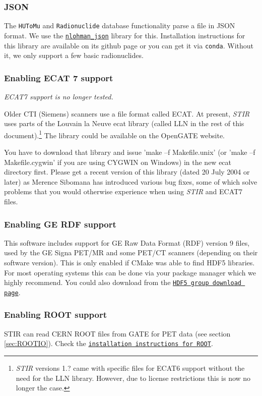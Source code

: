 \documentclass{article}
\def\url#1#2{\mbox{\href{#1}{\tt #2}}}
\begin{document}
\subsubsection{JSON}
The \texttt{HUToMu} and \texttt{Radionuclide} database functionality parse a file in JSON format. We use the
\url{https://github.com/nlohmann/json}{nlohman\_json} library for this. Installation
instructions for this library are available on its github page or you can get it via \texttt{conda}.
Without it, we only support a few basic radionuclides.

\subsubsection{
Enabling ECAT 7 support\label{sec:ECAT67support}}
{\em ECAT7 support is no longer tested.}

Older CTI (Siemens) scanners use a file format called ECAT\texttrademark{}.
At present, \textit{STIR} uses parts of the Louvain la Neuve ecat library (called LLN in
the rest of this document).\footnote{\textit{STIR} versions 1.? came with
specific files for ECAT6 support without the need for the LLN library. 
However, due to license restrictions this is now no longer the case.} 
The library could be  available on  the OpenGATE website.

You have to download that library and issue 'make --f Makefile.unix' 
(or 'make --f Makefile.cygwin' if you are using CYGWIN on Windows) 
in the new ecat directory first. Please get a recent version 
of this library (dated 20 July 2004 or later) as Merence Sibomana 
has introduced various bug fixes, some of which solve problems 
that you would otherwise experience when using \textit{STIR} and ECAT7 
files.

\subsubsection{
Enabling GE RDF  support}
\label{sec:RDFsupport}
This software includes support for GE Raw Data Format (RDF) version 9 files, used
by the GE Signa PET/MR and some PET/CT scanners (depending on their software version). This is only enabled if CMake was able to find HDF5 libraries.
For most operating systems this can be done via your package manager which we highly recommend. You could also
download from the \url{https://www.hdfgroup.org/downloads/hdf5/}{HDF5 group download page}.

\subsubsection{
Enabling ROOT support\label{sec:installROOT}}
STIR can read CERN ROOT files from GATE for PET data (see section \ref{sec:ROOTIO}). Check the \url{https://root.cern/install/}{installation instructions for ROOT}.
\end{document}
